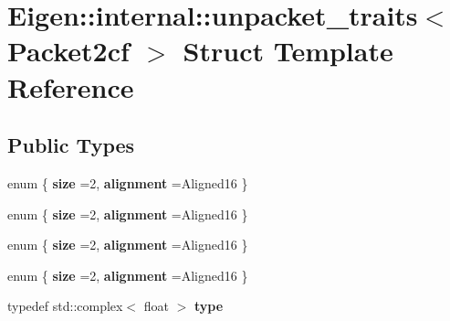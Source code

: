 \hypertarget{struct_eigen_1_1internal_1_1unpacket__traits_3_01_packet2cf_01_4}{}\section{Eigen\+::internal\+::unpacket\+\_\+traits$<$ Packet2cf $>$ Struct Template Reference}
\label{struct_eigen_1_1internal_1_1unpacket__traits_3_01_packet2cf_01_4}
\subsection*{Public Types}
\begin{DoxyCompactItemize}
\item 
\mbox{\label{struct_eigen_1_1internal_1_1unpacket__traits_3_01_packet2cf_01_4_a795b98068e044d68ba2df3b00977c99b}} 
enum \{ {\bfseries size} =2, 
{\bfseries alignment} =Aligned16
 \}
\item 
\mbox{\label{struct_eigen_1_1internal_1_1unpacket__traits_3_01_packet2cf_01_4_aa3b0c0788d022996c6980c401864e348}} 
enum \{ {\bfseries size} =2, 
{\bfseries alignment} =Aligned16
 \}
\item 
\mbox{\label{struct_eigen_1_1internal_1_1unpacket__traits_3_01_packet2cf_01_4_ab15efb520c794fd6de032fbd209f6949}} 
enum \{ {\bfseries size} =2, 
{\bfseries alignment} =Aligned16
 \}
\item 
\mbox{\label{struct_eigen_1_1internal_1_1unpacket__traits_3_01_packet2cf_01_4_a0093406beee6df3c84853ca51c7021bf}} 
enum \{ {\bfseries size} =2, 
{\bfseries alignment} =Aligned16
 \}
\item 
\mbox{\label{struct_eigen_1_1internal_1_1unpacket__traits_3_01_packet2cf_01_4_a55870d9184e1deef0663f4d6741bc3c2}} 
typedef std\+::complex$<$ float $>$ {\bfseries type}
\item 
\mbox{\label{struct_eigen_1_1internal_1_1unpacket__traits_3_01_packet2cf_01_4_a706e6fd2e56f984265c7d4696448973d}} 

\end{DoxyCompactItemize}
